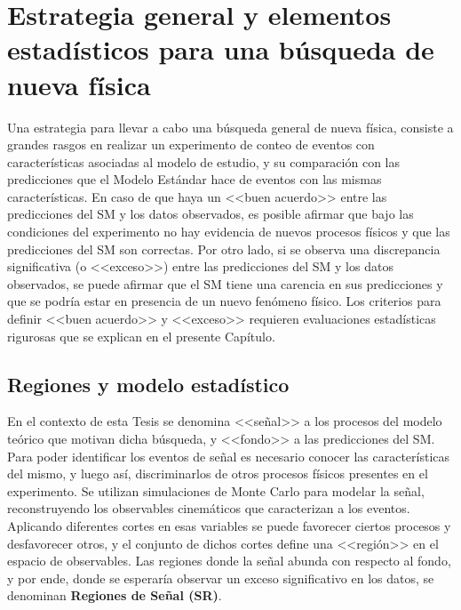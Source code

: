 \chapter{Estrategia general y elementos estadísticos para una búsqueda de nueva física}\label{cap:statistical}


Una estrategia para llevar a cabo una búsqueda general de nueva física, consiste a grandes rasgos en realizar un experimento de conteo de eventos con características asociadas al modelo de estudio, y su comparación con las predicciones que el Modelo Estándar hace de eventos con las mismas características. En caso de que haya un <<buen acuerdo>> entre las predicciones del SM y los datos observados, es posible afirmar que bajo las condiciones del experimento no hay evidencia de nuevos procesos físicos y que las predicciones del SM son correctas. 
Por otro lado, si se observa una discrepancia significativa (o <<exceso>>) entre las predicciones del SM y
los datos observados, se puede afirmar que el SM tiene una carencia en sus predicciones y que se podría estar en presencia de un nuevo fenómeno físico. Los criterios para definir <<buen acuerdo>> y <<exceso>> requieren evaluaciones estadísticas rigurosas que se explican en el presente Capítulo. 

\section{Regiones y modelo estadístico}

En el contexto de esta Tesis se denomina <<señal>> a los procesos del modelo teórico que motivan dicha búsqueda, y <<fondo>> a las predicciones del SM. Para poder identificar los eventos de señal es necesario conocer las características del mismo, y luego así, discriminarlos de otros procesos físicos presentes en el experimento. Se utilizan simulaciones de Monte Carlo para modelar la señal, reconstruyendo los observables cinemáticos que caracterizan a los eventos. Aplicando diferentes cortes en esas variables se puede favorecer ciertos procesos y desfavorecer otros, y el conjunto de dichos cortes define una <<región>> en el espacio de observables. Las regiones donde la señal abunda con respecto al fondo, y por ende, donde se esperaría observar un exceso significativo en los datos, se denominan \textbf{Regiones de Señal (SR)}.

